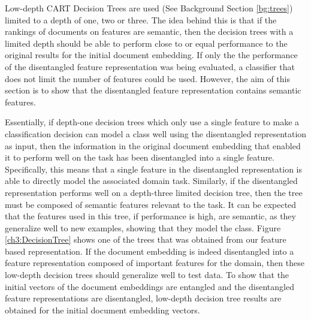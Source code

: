 Low-depth  CART Decision Trees  are used (See Background Section \ref{bg:trees}) limited to a depth of one, two or three. The idea behind this is that if the rankings of documents on features are semantic, then the decision trees with a limited depth should be able to perform close to or equal performance to the original results for the initial document embedding.  If only the the performance of the disentangled feature representation was being evaluated, a classifier that does not limit the number of features could be used. However, the aim of this section is to show that the disentangled feature representation contains semantic features. 

Essentially, if depth-one decision trees  which only use a single feature to make a classification decision can model a class well using the disentangled representation as input, then the information in  the original document embedding that enabled it to perform well on the task has been disentangled into a single feature. Specifically, this means that a single feature in the disentangled representation is able to directly model the associated domain task. Similarly, if the disentangled representation performs well on a depth-three limited decision tree, then the tree must be composed of semantic features relevant to the task. It can be expected that the features used in this tree, if performance is high, are semantic, as they generalize well to new examples, showing that they model the class.   Figure \ref{ch3:DecisionTree} shows one of the trees that was obtained from our feature based representation.  If the document embedding is indeed disentangled into a feature representation composed of important features for the domain, then these low-depth decision trees should generalize well to test data. To show that the initial vectors of the document embeddings are entangled and the disentangled feature representations are disentangled, low-depth decision tree results are  obtained for the initial document embedding vectors. 




